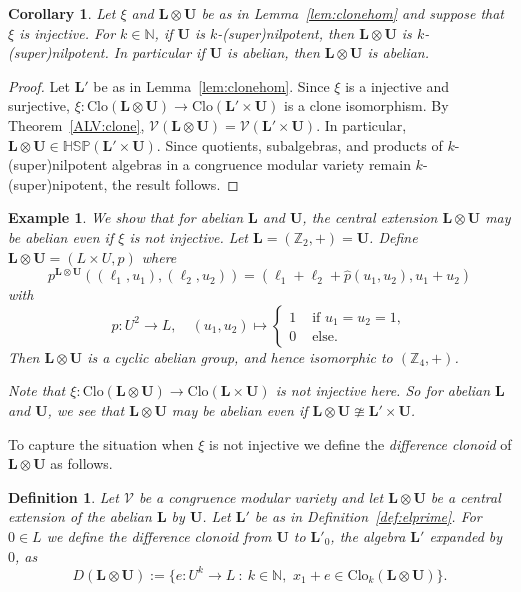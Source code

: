 \documentclass[10pt,a4paper]{amsart}
\numberwithin{equation}{section}
\newtheorem{cor}[theorem]{Corollary}
\newtheorem{definition}[theorem]{Definition}
\newtheorem{exa}[theorem]{Example}
\newcommand{\st}{\ :\ }
\renewcommand{\L}{\mathbf{L}}
\newcommand{\N}{\mathbb{N}}
\newcommand{\U}{\mathbf{U}}
\newcommand{\V}{\mathcal{V}}
\newcommand{\Z}{\mathbb{Z}}
\newcommand{\Clo}{\mathrm{Clo}}
\begin{document}
\begin{cor} 
  Let $\xi$ and $\L \otimes \U$  be as in Lemma~\ref{lem:clonehom} and suppose that $\xi$ is injective. 
  For $k \in \N$, if $\U$ is $k$-(super)nilpotent, then $\L \otimes \U$ is $k$-(super)nilpotent.
  In particular if $\U$ is abelian, then $\L \otimes \U$ is abelian. 
\end{cor}
\begin{proof}
  Let $\L'$ be as in Lemma~\ref{lem:clonehom}.
  Since $\xi$ is a injective and surjective, 
    $\xi \colon \Clo(\L \otimes \U) \rightarrow \Clo(\L' \times \U)$ is a clone isomorphism.
  By Theorem~\ref{ALV:clone}, $\V(\L \otimes \U) = \V(\L' \times \U)$.
  In particular, $\L \otimes \U \in \mathbb{HSP}(\L' \times \U)$.
  Since quotients, subalgebras, and products of $k$-(super)nilpotent algebras in a congruence modular variety 
  remain $k$-(super)nipotent, the result follows. 
\end{proof}

\begin{exa} 
  We show that for abelian $\L$ and $\U$, the central extension $\L \otimes \U$ may be abelian even if $\xi$ is not injective. %
  Let $\L = (\Z_2, +) = \U$. 
  Define $\L \otimes \U = (L \times U, p)$ 
    where 
    \[p^{\L \otimes \U}((\ell_1, u_1) , (\ell_2, u_2))= (\ell_1 + \ell_2 + \hat{p}(u_1,u_2), u_1 + u_2)\]
    with 
    \[ \hat{p} \colon U^2 \rightarrow L, \quad  (u_1, u_2) \mapsto 
      \begin{cases} 
        1  & \text{ if } u_1 = u_2 = 1, \\ 
        0 & \text{ else.} 
      \end{cases}\]
  Then $\L \otimes \U$ is a cyclic abelian group, and hence isomorphic to $(\Z_4, +)$.

  Note that $\xi \colon \Clo(\L \otimes \U) \rightarrow \Clo(\L \times \U)$ is not injective here. 
  So for abelian $\L$ and $\U$, we see that $\L \otimes \U$ may be abelian even if  $\L \otimes \U \ncong \L' \times \U$.
\end{exa}

To capture the situation when $\xi$ is not injective we define the \emph{difference clonoid} of $\L\otimes\U$ as follows.
 
\begin{definition} \label{def:differenceclonoid} 
  Let $\V$ be a congruence modular variety and let $\L \otimes \U$ be a central extension of the abelian $\L$ by $\U$.
  Let  $\L'$ be as in Definition~\ref{def:elprime}.
  For $0 \in L$ we define the \emph{difference clonoid} from $\U$ to $\L'_0$, the algebra $\L'$ expanded by $0$, as
    \[ D(\L\otimes\U) := \{ e\colon U^k\to L \st k\in\N, \,\, x_1+e \in\Clo_k(\L\otimes\U) \}. \]
\end{definition}
\end{document}

